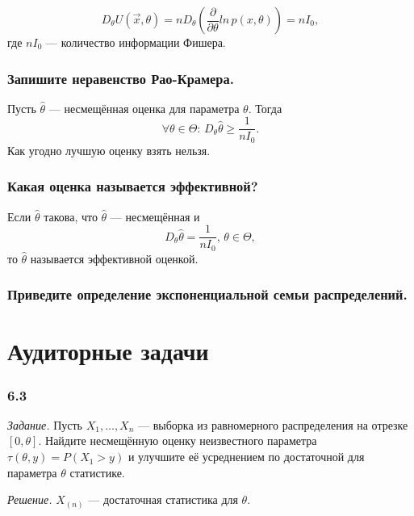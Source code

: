 $$D_{ \theta } U \left( \vec{x}, \theta \right) =
  nD_{ \theta } \left(
    \frac{ \partial }{ \partial \theta } ln \, p \left( x, \theta \right)
  \right) =
  nI_0,$$
где $nI_0$ --- количество информации Фишера.

\subsubsection*{Запишите неравенство Рао-Крамера.}

Пусть $ \hat{ \theta }$ --- несмещённая оценка для параметра $ \theta $.
Тогда
$$ \forall \theta \in \Theta: \,
  D_{ \theta } \hat{ \theta } \geq \frac{1}{nI_0}.$$
Как угодно лучшую оценку взять нельзя.

\subsubsection*{Какая оценка называется эффективной?}

Если $ \hat{ \theta }$ такова, что $ \hat{ \theta }$ --- несмещённая и
$$D_{ \theta } \hat{ \theta } =
  \frac{1}{nI_0}, \,
  \theta \in \Theta,$$
то $ \hat{ \theta }$ называется эффективной оценкой.

\subsubsection*{Приведите определение экспоненциальной семьи распределений.}

\section*{Аудиторные задачи}

\subsubsection*{6.3}

\textit{Задание.}
Пусть $X_1, \dotsc, X_n$ ---
выборка из равномерного распределения на отрезке $ \left[ 0, \theta \right].$
Найдите несмещённую оценку неизвестного параметра
$ \tau \left( \theta, y \right) =
  P \left( X_1 > y \right) $
и улучшите её усреднением по достаточной для параметра $ \theta $ статистике.

\textit{Решение.} $X_{ \left( n \right) }$ --- достаточная статистика для $ \theta $.

